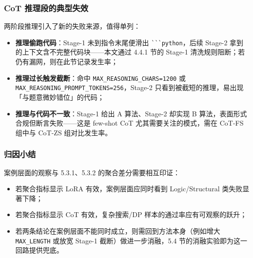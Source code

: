 \subsubsection{CoT 推理段的典型失效}
两阶段推理引入了新的失败来源，值得单列：
\begin{itemize}
    \item \textbf{推理偷跑代码}：Stage-1 未到指令末尾便滑出 \verb|```python|，后续 Stage-2 拿到的上下文含不完整代码块——本文通过 4.4.1 节的 Stage-1 清洗规则阻断；若仍有漏网，则在此节记录发生率；
    \item \textbf{推理过长触发截断}：命中 \texttt{MAX\_REASONING\_CHARS=1200} 或 \texttt{MAX\_REASONING\_PROMPT\_TOKENS=256}，Stage-2 只看到被截短的推理，易出现「与题意微妙错位」的代码；
    \item \textbf{推理与代码不一致}：Stage-1 给出 A 算法、Stage-2 却实现 B 算法，表面形式合规但断言失败——这是 few-shot CoT 尤其需要关注的模式，需在 CoT-FS 组中与 CoT-ZS 组对比发生率。
\end{itemize}

\subsubsection{归因小结}
案例层面的观察与 5.3.1、5.3.2 的聚合差分需要相互印证：
\begin{itemize}
    \item 若聚合指标显示 LoRA 有效，案例层面应同时看到 Logic/Structural 类失败显著下降；
    \item 若聚合指标显示 CoT 有效，复杂搜索/DP 样本的通过率应有可观察的跃升；
    \item 若两条结论在案例层面不能同时成立，则需回到方法本身（例如增大 \texttt{MAX\_LENGTH} 或放宽 Stage-1 截断）做进一步消融，5.4 节的消融实验即为这一回路提供兜底。
\end{itemize}